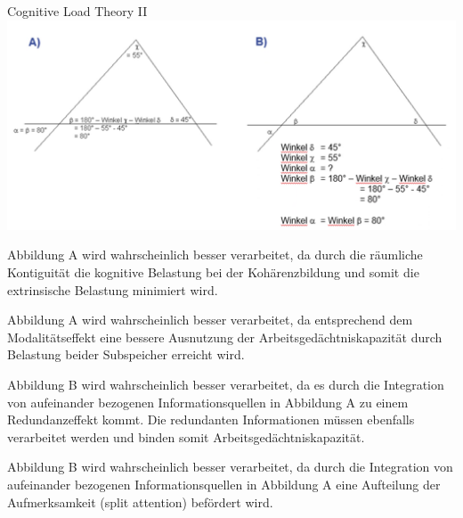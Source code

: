 \begin{multiple-choice}{Cognitive Load Theory II}
    \includegraphics[width=\fpeval{0.7*\textwidth}pt]{Cognitive Load Theory.png}
    \begin{answers}
        \item[\correct] Abbildung A wird wahrscheinlich besser verarbeitet, da durch die räumliche Kontiguität die kognitive Belastung bei der Kohärenzbildung und somit die extrinsische Belastung minimiert wird.
        \item[\wrong] Abbildung A wird wahrscheinlich besser verarbeitet, da entsprechend dem Modalitätseffekt eine bessere Ausnutzung der Arbeitsgedächtniskapazität durch Belastung beider Subspeicher erreicht wird.
        \item[\wrong] Abbildung B wird wahrscheinlich besser verarbeitet, da es durch die Integration von aufeinander bezogenen Informationsquellen in Abbildung A zu einem Redundanzeffekt kommt. Die redundanten Informationen müssen ebenfalls verarbeitet werden und binden somit Arbeitsgedächtniskapazität.
        \item[\wrong] Abbildung B wird wahrscheinlich besser verarbeitet, da durch die Integration von aufeinander bezogenen Informationsquellen in Abbildung A eine Aufteilung der Aufmerksamkeit (split attention) befördert wird.
    \end{answers}
\end{multiple-choice}

